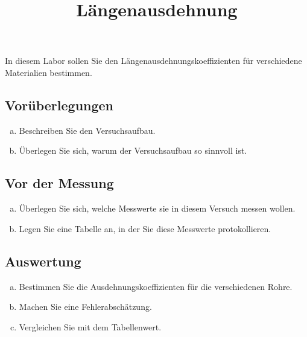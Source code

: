 \documentclass[11pt,a5paper, twosite]{article}
\author{}
\date{}
\title{Längenausdehnung}
\begin{document}
\maketitle

In diesem Labor sollen Sie den Längenausdehnungskoeffizienten für verschiedene Materialien bestimmen.

\subsection*{Vorüberlegungen}
\begin{enumerate}[a)]
	\item Beschreiben Sie den Versuchsaufbau.
	\item Überlegen Sie sich, warum der Versuchsaufbau so sinnvoll ist.
\end{enumerate}

\subsection*{Vor der Messung}
\begin{enumerate}[c)]
	\item Überlegen Sie sich, welche Messwerte sie in diesem Versuch messen wollen.
	\item Legen Sie eine Tabelle an, in der Sie diese Messwerte protokollieren.
\end{enumerate}

\subsection*{Auswertung}
\begin{enumerate}[e)]
	\item Bestimmen Sie die Ausdehnungskoeffizienten für die verschiedenen Rohre.
	\item Machen Sie eine Fehlerabschätzung.
	\item Vergleichen Sie mit dem Tabellenwert.
\end{enumerate}
\end{document}
